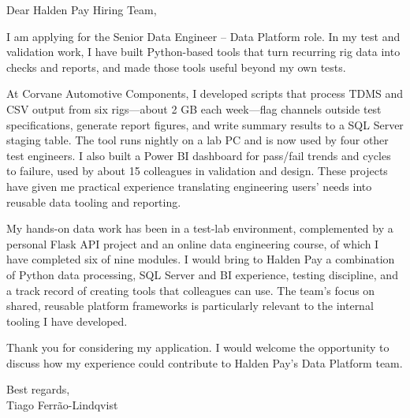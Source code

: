 \documentclass[11pt,a4paper]{article}
\begin{document}
Dear Halden Pay Hiring Team,

I am applying for the Senior Data Engineer – Data Platform role. In my test and validation work, I have built Python-based tools that turn recurring rig data into checks and reports, and made those tools useful beyond my own tests.

At Corvane Automotive Components, I developed scripts that process TDMS and CSV output from six rigs—about 2 GB each week—flag channels outside test specifications, generate report figures, and write summary results to a SQL Server staging table. The tool runs nightly on a lab PC and is now used by four other test engineers. I also built a Power BI dashboard for pass/fail trends and cycles to failure, used by about 15 colleagues in validation and design. These projects have given me practical experience translating engineering users’ needs into reusable data tooling and reporting.

My hands-on data work has been in a test-lab environment, complemented by a personal Flask API project and an online data engineering course, of which I have completed six of nine modules. I would bring to Halden Pay a combination of Python data processing, SQL Server and BI experience, testing discipline, and a track record of creating tools that colleagues can use. The team’s focus on shared, reusable platform frameworks is particularly relevant to the internal tooling I have developed.

Thank you for considering my application. I would welcome the opportunity to discuss how my experience could contribute to Halden Pay’s Data Platform team.

Best regards,\\
Tiago Ferrão-Lindqvist
\end{document}
